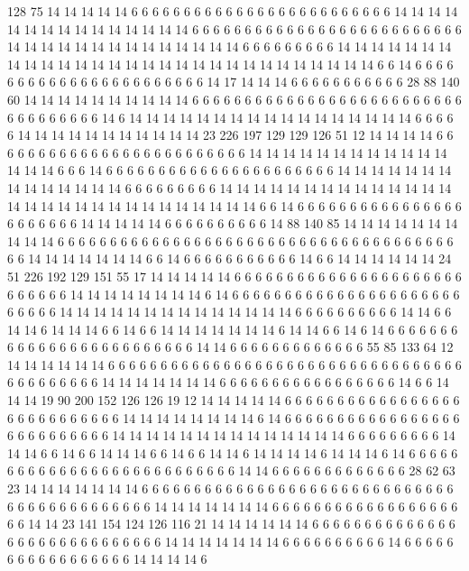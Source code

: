 128 75 14 14 14 14 14 6 6 6 6 6 6 6 6 6 6 6 6 6
6 6 6 6 6 6 6 6 6 6 6 6 14 14 14 14 14 14 14 14
14 14 14 14 14 14 14 6 6 6 6 6 6 6 6 6 6 6 6 6
6 6 6 6 6 6 6 6 6 6 6 6 6 14 14 14 14 14 14 14
14 14 14 14 14 14 14 6 6 6 6 6 6 6 6 6 14 14 14 14
14 14 14 14 14 14 14 14 14 14 14 14 14 14 14 14 14 14 14 14
14 14 14 14 14 6 6 14 6 6 6 6 6 6 6 6 6 6 6 6
6 6 6 6 6 6 6 6 6 6 6 14 17 14 14 14 6 6 6 6
6 6 6 6 6 6 6 28 88 140 60 14 14 14 14 14 14 14 14 14
14 6 6 6 6 6 6 6 6 6 6 6 6 6 6 6 6 6 6 6
6 6 6 6 6 6 6 6 6 6 6 6 6 6 6 6 14 6 14 14
14 14 14 14 14 14 14 14 14 14 14 14 14 14 14 6 6 6 6 6
14 14 14 14 14 14 14 14 14 14 14 23 226 197 129 129 126 51 12 14
14 14 14 6 6 6 6 6 6 6 6 6 6 6 6 6 6 6 6 6
6 6 6 6 6 6 6 6 14 14 14 14 14 14 14 14 14 14 14 14
14 14 14 6 6 6 14 6 6 6 6 6 6 6 6 6 6 6 6 6
6 6 6 6 6 6 6 6 6 14 14 14 14 14 14 14 14 14 14 14
14 14 14 6 6 6 6 6 6 6 6 6 14 14 14 14 14 14 14 14
14 14 14 14 14 14 14 14 14 14 14 14 14 14 14 14 14 14 14 14
14 6 6 14 6 6 6 6 6 6 6 6 6 6 6 6 6 6 6 6
6 6 6 6 6 6 6 14 14 14 14 14 6 6 6 6 6 6 6 6
6 6 14 88 140 85 14 14 14 14 14 14 14 14 14 14 6 6 6 6
6 6 6 6 6 6 6 6 6 6 6 6 6 6 6 6 6 6 6 6
6 6 6 6 6 6 6 6 6 6 6 6 6 6 6 6 14 14 14 14
14 14 14 6 6 14 6 6 6 6 6 6 6 6 6 6 6 14 6 6
14 14 14 14 14 14 24 51 226 192 129 151 55 17 14 14 14 14 14 6
6 6 6 6 6 6 6 6 6 6 6 6 6 6 6 6 6 6 6 6
6 6 6 6 6 6 6 14 14 14 14 14 14 14 14 6 14 6 6 6
6 6 6 6 6 6 6 6 6 6 6 6 6 6 6 6 6 6 6 6
6 6 6 6 14 14 14 14 14 14 14 14 14 14 14 14 14 14 6 6
6 6 6 6 6 6 6 6 14 14 6 6 14 14 6 14 14 14 6 6
14 6 6 14 14 14 14 14 14 14 6 14 14 6 6 14 6 14 6 6
6 6 6 6 6 6 6 6 6 6 6 6 6 6 6 6 6 6 6 6
6 6 6 14 14 6 6 6 6 6 6 6 6 6 6 6 6 6 55 85
133 64 12 14 14 14 14 14 14 6 6 6 6 6 6 6 6 6 6 6
6 6 6 6 6 6 6 6 6 6 6 6 6 6 6 6 6 6 6 6
6 6 6 6 6 6 6 6 6 6 6 6 14 14 14 14 14 14 14 6
6 6 6 6 6 6 6 6 6 6 6 6 6 6 6 6 14 6 6 14
14 14 19 90 200 152 126 126 19 12 14 14 14 14 14 6 6 6 6 6
6 6 6 6 6 6 6 6 6 6 6 6 6 6 6 6 6 6 6 6
6 6 6 14 14 14 14 14 14 14 14 6 14 6 6 6 6 6 6 6
6 6 6 6 6 6 6 6 6 6 6 6 6 6 6 6 6 6 6 6
14 14 14 14 14 14 14 14 14 14 14 14 14 14 6 6 6 6 6 6
6 6 6 14 14 14 6 6 14 6 6 14 14 14 6 6 14 6 6 14
14 6 14 14 14 14 6 14 14 14 6 14 6 6 6 6 6 6 6 6
6 6 6 6 6 6 6 6 6 6 6 6 6 6 6 6 6 6 6 14
14 6 6 6 6 6 6 6 6 6 6 6 6 6 28 62 63 23 14 14
14 14 14 14 14 6 6 6 6 6 6 6 6 6 6 6 6 6 6 6
6 6 6 6 6 6 6 6 6 6 6 6 6 6 6 6 6 6 6 6
6 6 6 6 6 6 6 6 6 14 14 14 14 14 14 14 6 6 6 6
6 6 6 6 6 6 6 6 6 6 6 6 6 6 6 6 14 14 23 141
154 124 126 116 21 14 14 14 14 14 14 6 6 6 6 6 6 6 6 6
6 6 6 6 6 6 6 6 6 6 6 6 6 6 6 6 6 6 6 6
14 14 14 14 14 14 14 6 6 6 6 6 6 6 6 6 6 14 6 6
6 6 6 6 6 6 6 6 6 6 6 6 6 6 6 14 14 14 14 6
